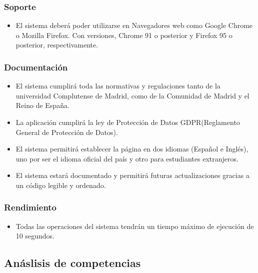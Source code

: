 \documentclass{article}
\begin{document}
        \subsubsection{Soporte}
            \begin{itemize}
                \item El sistema deberá poder utilizarse en Navegadores web como Google Chrome o Mozilla Firefox. Con versiones, Chrome 91 o posterior y Firefox 95 o posterior, respectivamente.
                \end{itemize}
        \subsubsection{Documentación}
            \begin{itemize}
                \item El sistema cumplirá toda las normativas y regulaciones tanto de la universidad Complutense de Madrid, como de la Comunidad de Madrid y el Reino de España.
                \item La aplicación cumplirá la ley de Protección de Datos GDPR(Reglamento General de Protección de Datos).
                \item El sistema permitirá establecer la página en dos idiomas (Español e Inglés), uno por ser el idioma oficial del país y otro para estudiantes extranjeros.
                \item El sistema estará documentado y permitirá futuras actualizaciones gracias a un código legible y ordenado.
            \end{itemize}

        \subsubsection{Rendimiento}
            \begin{itemize}
                \item Todas las operaciones del sistema tendrán un tiempo máximo de ejecución de 10 segundos.
            \end{itemize}


    \subsection{Anáslisis de competencias}
    
\end{document}
